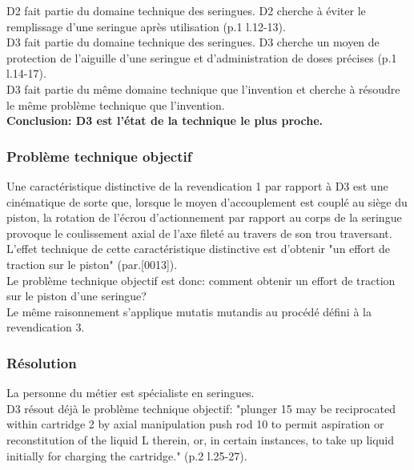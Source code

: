 D2 fait partie du domaine technique des seringues. D2 cherche à éviter le remplissage d'une seringue
après utilisation (p.1 l.12-13).\\

D3 fait partie du domaine technique des seringues. D3 cherche un moyen de protection de l'aiguille 
d'une seringue et d'administration de doses précises (p.1 l.14-17).\\

D3 fait partie du même domaine technique que l'invention et cherche à résoudre le même problème technique
que l'invention.\\

\textbf{Conclusion: D3 est l'état de la technique le plus proche.}\\

\subsubsection{Problème technique objectif}

Une caractéristique distinctive de la revendication 1 par rapport à D3 est une cinématique de sorte que, 
lorsque le moyen d'accouplement est couplé au siège du piston,
  la rotation de l'écrou d'actionnement par rapport au corps de la seringue provoque le coulissement axial
  de l'axe fileté au travers de son trou traversant.\\

L'effet technique de cette caractéristique distinctive est d’obtenir 
"un effort de traction sur le piston" (par.[0013]).\\

Le problème technique objectif est donc: comment obtenir un effort de traction sur le piston d'une seringue?\\

Le même raisonnement s'applique mutatis mutandis au procédé défini à la revendication 3. 

\subsubsection{Résolution}

La personne du métier est spécialiste en seringues.\\

D3 résout déjà le problème technique objectif: "plunger 15 may be reciprocated within cartridge 2 by
axial manipulation push rod 10 to permit aspiration or reconstitution of the liquid L therein, or,
in certain instances, to take up liquid initially for charging the cartridge." (p.2 l.25-27).\\

